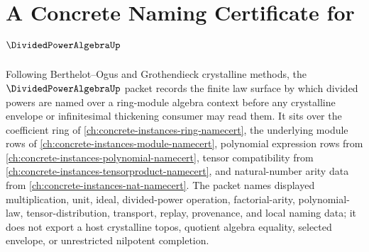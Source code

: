 \chapter{A Concrete Naming Certificate for $\DividedPowerAlgebraUp$}
\label{ch:concrete-instances-divided-power-algebra-namecert}

Following Berthelot--Ogus and Grothendieck crystalline methods, the $\DividedPowerAlgebraUp$ packet records the finite law surface by which divided powers are named over a ring-module algebra context before any crystalline envelope or infinitesimal thickening consumer may read them. It sits over the coefficient ring of \autoref{ch:concrete-instances-ring-namecert}, the underlying module rows of \autoref{ch:concrete-instances-module-namecert}, polynomial expression rows from \autoref{ch:concrete-instances-polynomial-namecert}, tensor compatibility from \autoref{ch:concrete-instances-tensorproduct-namecert}, and natural-number arity data from \autoref{ch:concrete-instances-nat-namecert}. The packet names displayed multiplication, unit, ideal, divided-power operation, factorial-arity, polynomial-law, tensor-distribution, transport, replay, provenance, and local naming data; it does not export a host crystalline topos, quotient algebra equality, selected envelope, or unrestricted nilpotent completion.

